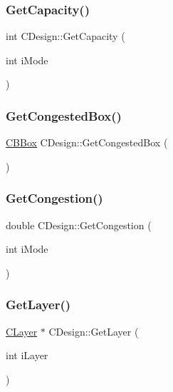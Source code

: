 \mbox{\label{classCDesign_a5167e124564fd469dbcfbae344c1f6f9}} 
\subsubsection{\texorpdfstring{GetCapacity()}{GetCapacity()}}
{\footnotesize\ttfamily int C\+Design\+::\+Get\+Capacity (\begin{DoxyParamCaption}\item[{int}]{i\+Mode }\end{DoxyParamCaption})}

\mbox{\label{classCDesign_a0ea51597e843c1f8f25dbfa4f4d4fa17}} 
\subsubsection{\texorpdfstring{GetCongestedBox()}{GetCongestedBox()}}
{\footnotesize\ttfamily \mbox{\hyperlink{classCBBox}{C\+B\+Box}} C\+Design\+::\+Get\+Congested\+Box (\begin{DoxyParamCaption}{ }\end{DoxyParamCaption})}

\mbox{\label{classCDesign_a18f8be6fd29a69a897bc98c5e4b880b6}} 
\subsubsection{\texorpdfstring{GetCongestion()}{GetCongestion()}}
{\footnotesize\ttfamily double C\+Design\+::\+Get\+Congestion (\begin{DoxyParamCaption}\item[{int}]{i\+Mode }\end{DoxyParamCaption})}

\mbox{\label{classCDesign_a33e73f8a75aa2198ff498f7f67633e9a}} 
\subsubsection{\texorpdfstring{GetLayer()}{GetLayer()}}
{\footnotesize\ttfamily \mbox{\hyperlink{classCLayer}{C\+Layer}} $\ast$ C\+Design\+::\+Get\+Layer (\begin{DoxyParamCaption}\item[{int}]{i\+Layer }\end{DoxyParamCaption})}

